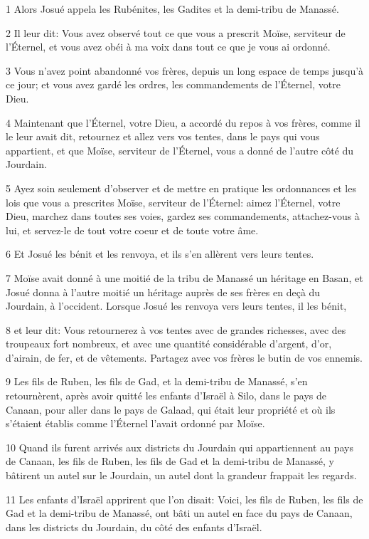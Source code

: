 \par 1 Alors Josué appela les Rubénites, les Gadites et la demi-tribu de Manassé.
\par 2 Il leur dit: Vous avez observé tout ce que vous a prescrit Moïse, serviteur de l'Éternel, et vous avez obéi à ma voix dans tout ce que je vous ai ordonné.
\par 3 Vous n'avez point abandonné vos frères, depuis un long espace de temps jusqu'à ce jour; et vous avez gardé les ordres, les commandements de l'Éternel, votre Dieu.
\par 4 Maintenant que l'Éternel, votre Dieu, a accordé du repos à vos frères, comme il le leur avait dit, retournez et allez vers vos tentes, dans le pays qui vous appartient, et que Moïse, serviteur de l'Éternel, vous a donné de l'autre côté du Jourdain.
\par 5 Ayez soin seulement d'observer et de mettre en pratique les ordonnances et les lois que vous a prescrites Moïse, serviteur de l'Éternel: aimez l'Éternel, votre Dieu, marchez dans toutes ses voies, gardez ses commandements, attachez-vous à lui, et servez-le de tout votre coeur et de toute votre âme.
\par 6 Et Josué les bénit et les renvoya, et ils s'en allèrent vers leurs tentes.
\par 7 Moïse avait donné à une moitié de la tribu de Manassé un héritage en Basan, et Josué donna à l'autre moitié un héritage auprès de ses frères en deçà du Jourdain, à l'occident. Lorsque Josué les renvoya vers leurs tentes, il les bénit,
\par 8 et leur dit: Vous retournerez à vos tentes avec de grandes richesses, avec des troupeaux fort nombreux, et avec une quantité considérable d'argent, d'or, d'airain, de fer, et de vêtements. Partagez avec vos frères le butin de vos ennemis.
\par 9 Les fils de Ruben, les fils de Gad, et la demi-tribu de Manassé, s'en retournèrent, après avoir quitté les enfants d'Israël à Silo, dans le pays de Canaan, pour aller dans le pays de Galaad, qui était leur propriété et où ils s'étaient établis comme l'Éternel l'avait ordonné par Moïse.
\par 10 Quand ils furent arrivés aux districts du Jourdain qui appartiennent au pays de Canaan, les fils de Ruben, les fils de Gad et la demi-tribu de Manassé, y bâtirent un autel sur le Jourdain, un autel dont la grandeur frappait les regards.
\par 11 Les enfants d'Israël apprirent que l'on disait: Voici, les fils de Ruben, les fils de Gad et la demi-tribu de Manassé, ont bâti un autel en face du pays de Canaan, dans les districts du Jourdain, du côté des enfants d'Israël.
